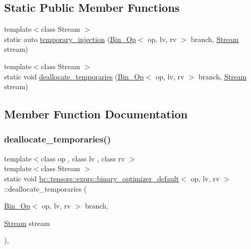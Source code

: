 \subsection*{Static Public Member Functions}
\begin{DoxyCompactItemize}
\item 
{\footnotesize template$<$class Stream $>$ }\\static auto \hyperlink{structbc_1_1tensors_1_1exprs_1_1binary__optimizer__default_a3ed135706adb417fe480b8618c96dbee}{temporary\+\_\+injection} (\hyperlink{structbc_1_1tensors_1_1exprs_1_1Bin__Op}{Bin\+\_\+\+Op}$<$ op, lv, rv $>$ branch, \hyperlink{classbc_1_1streams_1_1Stream}{Stream} stream)
\item 
{\footnotesize template$<$class Stream $>$ }\\static void \hyperlink{structbc_1_1tensors_1_1exprs_1_1binary__optimizer__default_a02ba1ba9a7885877477eb602f2ef230b}{deallocate\+\_\+temporaries} (\hyperlink{structbc_1_1tensors_1_1exprs_1_1Bin__Op}{Bin\+\_\+\+Op}$<$ op, lv, rv $>$ branch, \hyperlink{classbc_1_1streams_1_1Stream}{Stream} stream)
\end{DoxyCompactItemize}


\subsection{Member Function Documentation}
\mbox{\label{structbc_1_1tensors_1_1exprs_1_1binary__optimizer__default_a02ba1ba9a7885877477eb602f2ef230b}} 
\subsubsection{\texorpdfstring{deallocate\+\_\+temporaries()}{deallocate\_temporaries()}}
{\footnotesize\ttfamily template$<$class op , class lv , class rv $>$ \\
template$<$class Stream $>$ \\
static void \hyperlink{structbc_1_1tensors_1_1exprs_1_1binary__optimizer__default}{bc\+::tensors\+::exprs\+::binary\+\_\+optimizer\+\_\+default}$<$ op, lv, rv $>$\+::deallocate\+\_\+temporaries (\begin{DoxyParamCaption}\item[{\hyperlink{structbc_1_1tensors_1_1exprs_1_1Bin__Op}{Bin\+\_\+\+Op}$<$ op, lv, rv $>$}]{branch,  }\item[{\hyperlink{classbc_1_1streams_1_1Stream}{Stream}}]{stream }\end{DoxyParamCaption})\hspace{0.3cm}{\ttfamily [inline]}, {\ttfamily [static]}}

